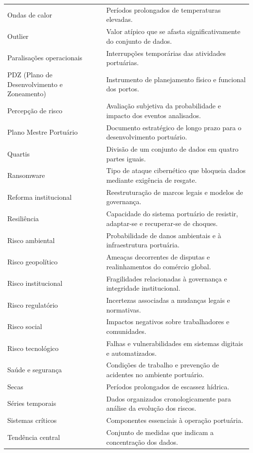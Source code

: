 \documentclass[
  portuguese,
  letterpaper,
  DIV=11,
  numbers=noendperiod]{scrreprt}
\begin{document}
\begin{longtable}[]{@{}
  >{\raggedright\arraybackslash}p{}
  >{\raggedright\arraybackslash}p{}@{}}
Ondas de calor & Períodos prolongados de temperaturas elevadas. \\
Outlier & Valor atípico que se afasta significativamente do conjunto de
dados. \\
Paralisações operacionais & Interrupções temporárias das atividades
portuárias. \\
PDZ (Plano de Desenvolvimento e Zoneamento) & Instrumento de
planejamento físico e funcional dos portos. \\
Percepção de risco & Avaliação subjetiva da probabilidade e impacto dos
eventos analisados. \\
Plano Mestre Portuário & Documento estratégico de longo prazo para o
desenvolvimento portuário. \\
Quartis & Divisão de um conjunto de dados em quatro partes iguais. \\
Ransomware & Tipo de ataque cibernético que bloqueia dados mediante
exigência de resgate. \\
Reforma institucional & Reestruturação de marcos legais e modelos de
governança. \\
Resiliência & Capacidade do sistema portuário de resistir, adaptar-se e
recuperar-se de choques. \\
Risco ambiental & Probabilidade de danos ambientais e à infraestrutura
portuária. \\
Risco geopolítico & Ameaças decorrentes de disputas e realinhamentos do
comércio global. \\
Risco institucional & Fragilidades relacionadas à governança e
integridade institucional. \\
Risco regulatório & Incertezas associadas a mudanças legais e
normativas. \\
Risco social & Impactos negativos sobre trabalhadores e comunidades. \\
Risco tecnológico & Falhas e vulnerabilidades em sistemas digitais e
automatizados. \\
Saúde e segurança & Condições de trabalho e prevenção de acidentes no
ambiente portuário. \\
Secas & Períodos prolongados de escassez hídrica. \\
Séries temporais & Dados organizados cronologicamente para análise da
evolução dos riscos. \\
Sistemas críticos & Componentes essenciais à operação portuária. \\
Tendência central & Conjunto de medidas que indicam a concentração dos
dados. \\

\end{longtable}
\end{document}
